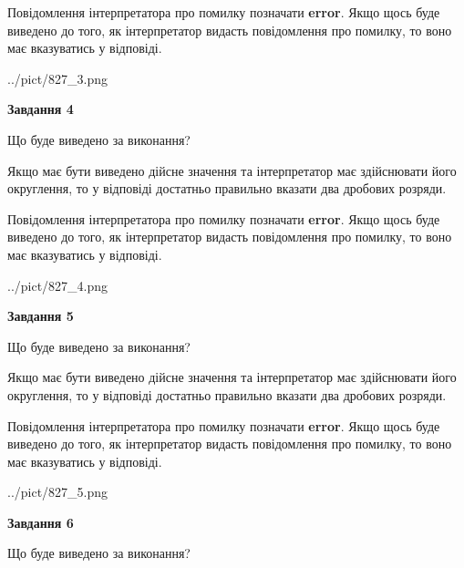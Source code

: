\documentclass[12pt, ukrainian]{article}
\begin{document}
{\begin {Large}
Повідомлення інтерпретатора про помилку позначати \textbf{error}.
Якщо щось буде виведено до того, як інтерпретатор видасть повідомлення про помилку, 
то воно має вказуватись у відповіді. \par

\begin{center}
	{../pict/827_3.png}
\end{center}
\newpage

{\begin {center}\textbf{Завдання 4}\end {center}}\par
Що буде виведено за виконання? \par

Якщо має бути виведено дійсне значення та інтерпретатор має здійснювати його округлення, 
то у відповіді достатньо правильно вказати два дробових розряди.

Повідомлення інтерпретатора про помилку позначати \textbf{error}.
Якщо щось буде виведено до того, як інтерпретатор видасть повідомлення про помилку, 
то воно має вказуватись у відповіді. \par

\begin{center}
	{../pict/827_4.png}
\end{center}
\newpage

{\begin {center}\textbf{Завдання 5}\end {center}}\par
Що буде виведено за виконання? \par

Якщо має бути виведено дійсне значення та інтерпретатор має здійснювати його округлення, 
то у відповіді достатньо правильно вказати два дробових розряди.

Повідомлення інтерпретатора про помилку позначати \textbf{error}.
Якщо щось буде виведено до того, як інтерпретатор видасть повідомлення про помилку, 
то воно має вказуватись у відповіді. \par

\begin{center}
	{../pict/827_5.png}
\end{center}
\newpage

{\begin {center}\textbf{Завдання 6}\end {center}}\par
Що буде виведено за виконання? \par


\end{Large}}
\end{document}
